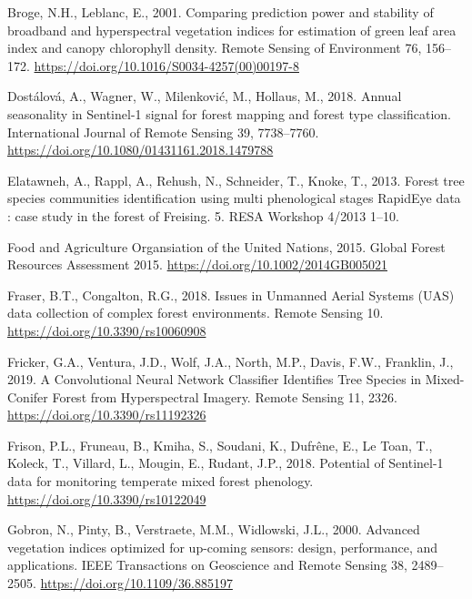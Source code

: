 \documentclass[]{article}
\begin{document}
\leavevmode\hypertarget{ref-Broge2001}{}%
Broge, N.H., Leblanc, E., 2001. Comparing prediction power and stability
of broadband and hyperspectral vegetation indices for estimation of
green leaf area index and canopy chlorophyll density. Remote Sensing of
Environment 76, 156--172.
\url{https://doi.org/10.1016/S0034-4257(00)00197-8}

\leavevmode\hypertarget{ref-Dostalova2018}{}%
Dostálová, A., Wagner, W., Milenković, M., Hollaus, M., 2018. Annual
seasonality in Sentinel-1 signal for forest mapping and forest type
classification. International Journal of Remote Sensing 39, 7738--7760.
\url{https://doi.org/10.1080/01431161.2018.1479788}

\leavevmode\hypertarget{ref-Elatawneh2013}{}%
Elatawneh, A., Rappl, A., Rehush, N., Schneider, T., Knoke, T., 2013.
Forest tree species communities identification using multi phenological
stages RapidEye data : case study in the forest of Freising. 5. RESA
Workshop 4/2013 1--10.

\leavevmode\hypertarget{ref-FoodandAgricultureOrgansiationoftheUnitedNations2015}{}%
Food and Agriculture Organsiation of the United Nations, 2015. Global
Forest Resources Assessment 2015.
\url{https://doi.org/10.1002/2014GB005021}

\leavevmode\hypertarget{ref-Fraser2018a}{}%
Fraser, B.T., Congalton, R.G., 2018. Issues in Unmanned Aerial Systems
(UAS) data collection of complex forest environments. Remote Sensing 10.
\url{https://doi.org/10.3390/rs10060908}

\leavevmode\hypertarget{ref-Fricker2019}{}%
Fricker, G.A., Ventura, J.D., Wolf, J.A., North, M.P., Davis, F.W.,
Franklin, J., 2019. A Convolutional Neural Network Classifier Identifies
Tree Species in Mixed-Conifer Forest from Hyperspectral Imagery. Remote
Sensing 11, 2326. \url{https://doi.org/10.3390/rs11192326}

\leavevmode\hypertarget{ref-Frison2018}{}%
Frison, P.L., Fruneau, B., Kmiha, S., Soudani, K., Dufrêne, E., Le Toan,
T., Koleck, T., Villard, L., Mougin, E., Rudant, J.P., 2018. Potential
of Sentinel-1 data for monitoring temperate mixed forest phenology.
\url{https://doi.org/10.3390/rs10122049}

\leavevmode\hypertarget{ref-Gobron2000}{}%
Gobron, N., Pinty, B., Verstraete, M.M., Widlowski, J.L., 2000. Advanced
vegetation indices optimized for up-coming sensors: design, performance,
and applications. IEEE Transactions on Geoscience and Remote Sensing 38,
2489--2505. \url{https://doi.org/10.1109/36.885197}
\end{document}
